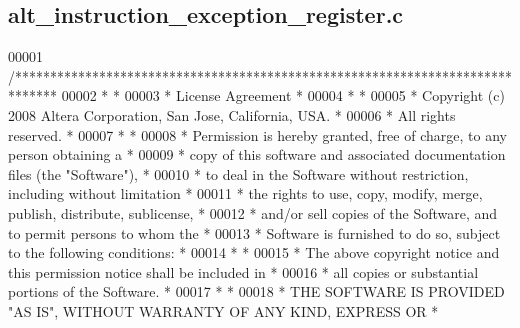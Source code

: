 \subsection{alt\+\_\+instruction\+\_\+exception\+\_\+register.\+c}
\label{alt__instruction__exception__register_8c_source}

\begin{DoxyCode}
00001 \textcolor{comment}{/******************************************************************************}
00002 \textcolor{comment}{*                                                                             *}
00003 \textcolor{comment}{* License Agreement                                                           *}
00004 \textcolor{comment}{*                                                                             *}
00005 \textcolor{comment}{* Copyright (c) 2008 Altera Corporation, San Jose, California, USA.           *}
00006 \textcolor{comment}{* All rights reserved.                                                        *}
00007 \textcolor{comment}{*                                                                             *}
00008 \textcolor{comment}{* Permission is hereby granted, free of charge, to any person obtaining a     *}
00009 \textcolor{comment}{* copy of this software and associated documentation files (the "Software"),  *}
00010 \textcolor{comment}{* to deal in the Software without restriction, including without limitation   *}
00011 \textcolor{comment}{* the rights to use, copy, modify, merge, publish, distribute, sublicense,    *}
00012 \textcolor{comment}{* and/or sell copies of the Software, and to permit persons to whom the       *}
00013 \textcolor{comment}{* Software is furnished to do so, subject to the following conditions:        *}
00014 \textcolor{comment}{*                                                                             *}
00015 \textcolor{comment}{* The above copyright notice and this permission notice shall be included in  *}
00016 \textcolor{comment}{* all copies or substantial portions of the Software.                         *}
00017 \textcolor{comment}{*                                                                             *}
00018 \textcolor{comment}{* THE SOFTWARE IS PROVIDED "AS IS", WITHOUT WARRANTY OF ANY KIND, EXPRESS OR  *}

\end{DoxyCode}

